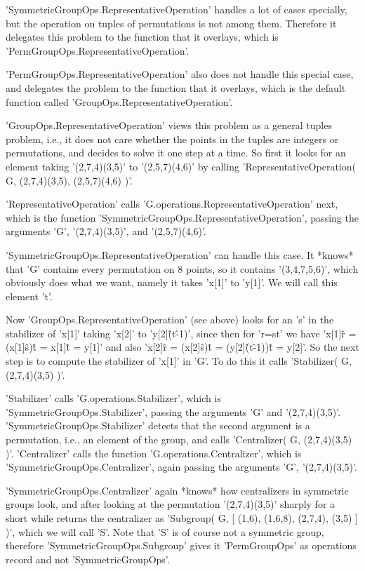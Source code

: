 'SymmetricGroupOps.RepresentativeOperation'  handles  a   lot  of   cases
specially, but the operation on tuples of permutations is not among them.
Therefore it delegates  this  problem  to the function that  it overlays,
which is 'PermGroupOps.RepresentativeOperation'.

'PermGroupOps.RepresentativeOperation' also does  not handle this special
case, and delegates the problem  to the function that it  overlays, which
is the default function called 'GroupOps.RepresentativeOperation'.

'GroupOps.RepresentativeOperation' views this problem as a general tuples
problem, i.e., it  does not  care  whether  the  points in the tuples are
integers or permutations, and decides to solve it one step at a time.  So
first it looks for  an element taking '(2,7,4)(3,5)' to '(2,5,7)(4,6)' by
calling 'RepresentativeOperation( G, (2,7,4)(3,5), (2,5,7)(4,6) )'.

'RepresentativeOperation'  calls   'G.operations.RepresentativeOperation'
next, which is the  function 'SymmetricGroupOps.RepresentativeOperation',
passing the arguments 'G', '(2,7,4)(3,5)', and '(2,5,7)(4,6)'.

'SymmetricGroupOps.RepresentativeOperation' can  handle  this  case.   It
*knows*  that 'G' contains every  permutation on 8 points, so it contains
'(3,4,7,5,6)',  which obviously does what we want, namely it takes 'x[1]'
to 'y[1]'.  We will call this element 't'.

Now 'GroupOps.RepresentativeOperation'  (see  above) looks  for an 's' in
the stabilizer of 'x[1]' taking 'x[2]' to 'y[2]\^(t\^-1)', since then for
'r=s\*t'  we have 'x[1]\^r  =  (x[1]\^s)\^t =  x[1]\^t  =  y[1]' and also
'x[2]\^r =  (x[2]\^s)\^t = (y[2]\^(t\^-1))\^t = y[2]'.   So the next step
is to compute  the  stabilizer  of 'x[1]' in  'G'.  To do this  it  calls
'Stabilizer( G, (2,7,4)(3,5) )'.

'Stabilizer'    calls     'G.operations.Stabilizer',        which      is
'SymmetricGroupOps.Stabilizer',  passing  the       arguments   'G'   and
'(2,7,4)(3,5)'.   'SymmetricGroupOps.Stabilizer' detects that  the second
argument  is a permutation, i.e.,  an  element of the   group,  and calls
'Centralizer( G,  (2,7,4)(3,5)  )'.  'Centralizer'   calls  the  function
'G.operations.Centralizer',   which is   'SymmetricGroupOps.Centralizer',
again passing the arguments 'G', '(2,7,4)(3,5)'.

'SymmetricGroupOps.Centralizer'   again  *knows*   how  centralizers   in
symmetric   groups  look,   and     after looking  at    the  permutation
'(2,7,4)(3,5)'  sharply  for  a  short  while returns  the centralizer as
'Subgroup( G,  [ (1,6), (1,6,8), (2,7,4), (3,5)  ] )', which we will call
'S'.  Note  that  'S'  is of  course not   a symmetric  group,  therefore
'SymmetricGroupOps.Subgroup' gives it 'PermGroupOps' as operations record
and not 'SymmetricGroupOps'.

